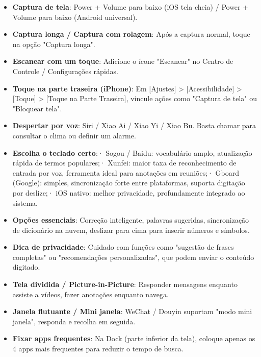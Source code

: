 
\begin{itemize}
  \item \textbf{Captura de tela}: Power + Volume para baixo (iOS tela cheia) / Power + Volume para baixo (Android universal).
  \item \textbf{Captura longa / Captura com rolagem}: Após a captura normal, toque na opção "Captura longa".
  \item \textbf{Escanear com um toque}: Adicione o ícone "Escanear" no Centro de Controle / Configurações rápidas.
  \item \textbf{Toque na parte traseira (iPhone)}: Em [Ajustes] > [Acessibilidade] > [Toque] > [Toque na Parte Traseira], vincule ações como "Captura de tela" ou "Bloquear tela".
  \item \textbf{Despertar por voz}: Siri / Xiao Ai / Xiao Yi / Xiao Bu. Basta chamar para consultar o clima ou definir um alarme.
\end{itemize}


\begin{itemize}
  \item \textbf{Escolha o teclado certo}:\newline · Sogou / Baidu: vocabulário amplo, atualização rápida de termos populares;\newline · Xunfei: maior taxa de reconhecimento de entrada por voz, ferramenta ideal para anotações em reuniões;\newline · Gboard (Google): simples, sincronização forte entre plataformas, suporta digitação por deslize;\newline · iOS nativo: melhor privacidade, profundamente integrado ao sistema.
  \item \textbf{Opções essenciais}: Correção inteligente, palavras sugeridas, sincronização de dicionário na nuvem, deslizar para cima para inserir números e símbolos.
  \item \textbf{Dica de privacidade}: Cuidado com funções como "sugestão de frases completas" ou "recomendações personalizadas", que podem enviar o conteúdo digitado.
\end{itemize}


\begin{itemize}
  \item \textbf{Tela dividida / Picture-in-Picture}: Responder mensagens enquanto assiste a vídeos, fazer anotações enquanto navega.
  \item \textbf{Janela flutuante / Mini janela}: WeChat / Douyin suportam "modo mini janela", responda e recolha em seguida.
  \item \textbf{Fixar apps frequentes}: Na Dock (parte inferior da tela), coloque apenas os 4 apps mais frequentes para reduzir o tempo de busca.
\end{itemize}

